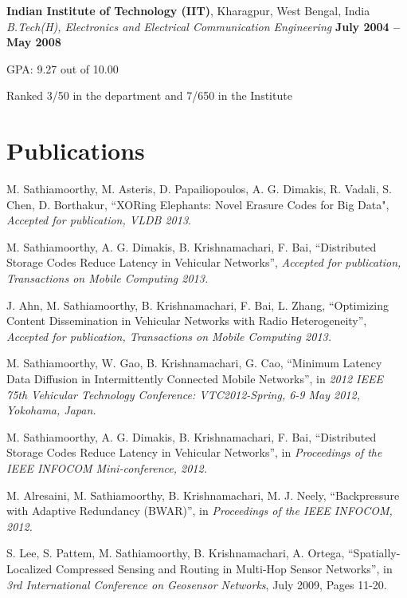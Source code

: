 \documentclass[margin,line]{resume}
\begin{document}
\begin{resume}
    
    \textbf{Indian Institute of Technology (IIT)}, Kharagpur, West Bengal, India \\%
    \textsl{B.Tech(H), Electronics and Electrical Communication Engineering} \hfill \textbf{ July 2004 -- May 2008}\vspace{-3mm}\\\vspace{-1mm}%
    \begin{list2}
    		\item GPA:	9.27 out of 10.00
    		\item Ranked 3/50 in the department and 7/650 in the Institute        
    \end{list2}\vspace{-1.5mm}%


\section{\mysidestyle Publications}
\begin{list2}  
   \item M. Sathiamoorthy, M. Asteris, D. Papailiopoulos, A. G. Dimakis, R. Vadali, S. Chen, D. Borthakur,
      ``XORing Elephants: Novel Erasure Codes for Big Data", \textsl{Accepted for publication, VLDB 2013}.
     \item M. Sathiamoorthy, A. G. Dimakis, B. Krishnamachari, F. Bai, 
     ``Distributed Storage Codes Reduce Latency in Vehicular Networks'', \textsl{Accepted for publication, Transactions on Mobile Computing 2013.}
     \item J. Ahn, M. Sathiamoorthy, B. Krishnamachari, F. Bai, L. Zhang, ``Optimizing Content Dissemination in Vehicular Networks with Radio Heterogeneity'', \textsl{Accepted for publication, Transactions on Mobile Computing 2013.}
      \item M. Sathiamoorthy, W. Gao, B. Krishnamachari, G. Cao,
    ``Minimum Latency Data Diffusion in Intermittently Connected Mobile Networks'', in
    \textsl{2012 IEEE 75th Vehicular Technology Conference: VTC2012-Spring, 6-9 May 2012, Yokohama, Japan.}
    \item M. Sathiamoorthy, A. G. Dimakis, B. Krishnamachari, F. Bai, 
    ``Distributed Storage Codes Reduce Latency in Vehicular Networks'', in
    \textsl{Proceedings of the IEEE INFOCOM Mini-conference, 2012.}
    \item M. Alresaini, M. Sathiamoorthy, B. Krishnamachari, M. J. Neely, ``Backpressure with Adaptive Redundancy (BWAR)'', 
    in \textsl{Proceedings of the IEEE INFOCOM, 2012.}
    \item S. Lee, S. Pattem, M. Sathiamoorthy, B. Krishnamachari, A. Ortega, ``Spatially-Localized Compressed Sensing and Routing in Multi-Hop Sensor Networks'', in \textsl{3rd International Conference on Geosensor Networks}, July 2009, Pages 11-20.  
    \end{list2}


\end{resume}
\end{document}
